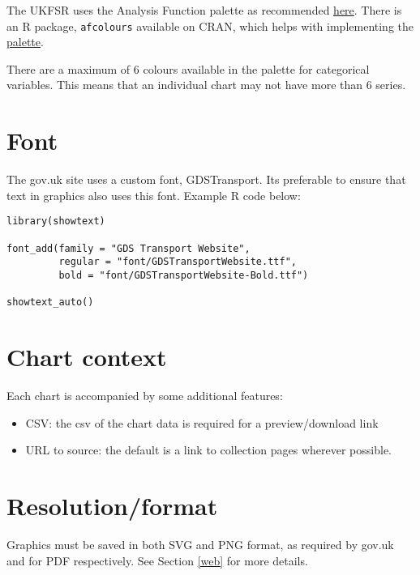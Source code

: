\documentclass[
]{book}
\providecommand{\tightlist}{%
  \setlength{\itemsep}{0pt}\setlength{\parskip}{0pt}}
\begin{document}
The UKFSR uses the Analysis Function palette as recommended \href{https://analysisfunction.civilservice.gov.uk/policy-store/data-visualisation-colours-in-charts/}{here}. There is an R package, \texttt{afcolours} available on CRAN, which helps with implementing the \href{https://best-practice-and-impact.github.io/afcolours/}{palette}.

There are a maximum of 6 colours available in the palette for categorical
variables. This means that an individual chart may not have more than 6 series.

\hypertarget{font}{%
\section{Font}\label{font}}

The gov.uk site uses a custom font, GDSTransport. Its preferable to ensure that
text in graphics also uses this font. Example R code below:

\begin{verbatim}
library(showtext)

font_add(family = "GDS Transport Website",
         regular = "font/GDSTransportWebsite.ttf",
         bold = "font/GDSTransportWebsite-Bold.ttf")

showtext_auto()
\end{verbatim}

\hypertarget{chart-context}{%
\section{Chart context}\label{chart-context}}

Each chart is accompanied by some additional features:

\begin{itemize}
\tightlist
\item
  CSV: the csv of the chart data is required for a preview/download link
\item
  URL to source: the default is a link to collection pages wherever possible.
\end{itemize}

\hypertarget{resolutionformat}{%
\section{Resolution/format}\label{resolutionformat}}

Graphics must be saved in both SVG and PNG format, as required by gov.uk and
for PDF respectively. See Section \ref{web} for more details.
\end{document}
